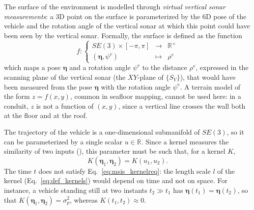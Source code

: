 The surface of the environment is modelled through \emph{virtual vertical sonar measurements}: a 3D
point on the surface is parameterized by the 6D pose of the vehicle and the rotation angle of the
vertical sonar at which this point could have been seen by the vertical sonar. Formally, the surface
is defined as the function
\begin{equation}                         %
  f : \left\{
  \begin{array}{rcl}
    SE(3) \times [-\pi, \pi] & \to     & \mathbb{R}^+ \\
    (\boldsymbol{\eta}, \psi^v) & \mapsto & \rho^v
  \end{array}\right.
  \label{eq:msis_surface}
\end{equation}
which maps a pose $\boldsymbol{\eta}$ and a rotation angle $\psi^v$ to the distance $\rho^v$,
expressed in the scanning plane of the vertical sonar (the $XY$-plane of $\{S_V\}$), that would have
been measured from the pose $\boldsymbol{\eta}$ with the rotation angle $\psi^v$. A terrain model of
the form $z = f(x, y)$, common in seafloor mapping, cannot be used here: in a conduit, $z$ is not a
function of $(x, y)$, since a vertical line crosses the wall both at the floor and at the roof.

The trajectory of the vehicle is a one-dimensional submanifold of $SE(3)$, so it can be
parameterized by a single scalar $u \in \mathbb{R}$. Since a kernel measures the similarity of two
inputs (), this parameter must be such that, for a kernel $K$,
\begin{equation}                         %
  K(\boldsymbol{\eta}_1, \boldsymbol{\eta}_2) = K(u_1, u_2).
  \label{eq:msis_kernelreq}
\end{equation}
The time $t$ does not satisfy Eq.~\eqref{eq:msis_kernelreq}: the length scale $l$ of the kernel
(Eq.~\eqref{eq:def_kernels}) would depend on time and not on space. For instance, a vehicle standing
still at two instants $t_2 \gg t_1$ has $\boldsymbol{\eta}(t_1) = \boldsymbol{\eta}(t_2)$, so that
$K(\boldsymbol{\eta}_1, \boldsymbol{\eta}_2) = \sigma_p^2$, whereas $K(t_1, t_2) \approx 0$.

